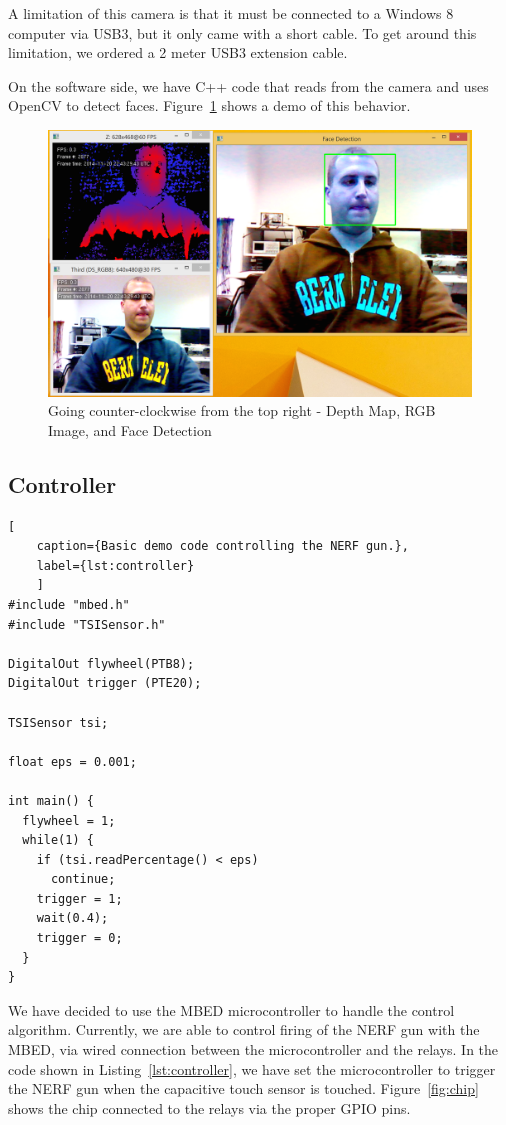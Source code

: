 \documentclass[journal]{IEEEtran}
\begin{document}
A limitation of this camera is that it must be connected to a Windows 8 computer via USB3, but it only came with a short cable. To get around this limitation, we ordered a 2 meter USB3 extension cable.

On the software side, we have C++ code that reads from the camera and uses OpenCV to detect faces. Figure~\ref{fig:face} shows a demo of this behavior.

\begin{figure}[htbp]
    \centering
    \includegraphics[width=0.85\linewidth]{face_detection.png}
    \caption{Going counter-clockwise  from the top right - Depth Map, RGB Image, and Face Detection}
    \label{fig:face}
\end{figure}

\subsection{Controller}

\vspace{3mm}
\begin{lstlisting}[
    caption={Basic demo code controlling the NERF gun.},
    label={lst:controller}
    ]
#include "mbed.h"
#include "TSISensor.h"

DigitalOut flywheel(PTB8);
DigitalOut trigger (PTE20);

TSISensor tsi;

float eps = 0.001;

int main() {
  flywheel = 1;
  while(1) {
    if (tsi.readPercentage() < eps)
      continue;
    trigger = 1;
    wait(0.4);
    trigger = 0;
  }
}
\end{lstlisting}

We have decided to use the MBED microcontroller to handle the control algorithm. Currently, we are able to control firing of the NERF gun with the MBED, via wired connection between the microcontroller and the relays. In the code shown in Listing~\ref{lst:controller}, we have set the microcontroller to trigger the NERF gun when the capacitive touch sensor is touched. Figure~\ref{fig:chip} shows the chip connected to the relays via the proper GPIO pins.
\end{document}
